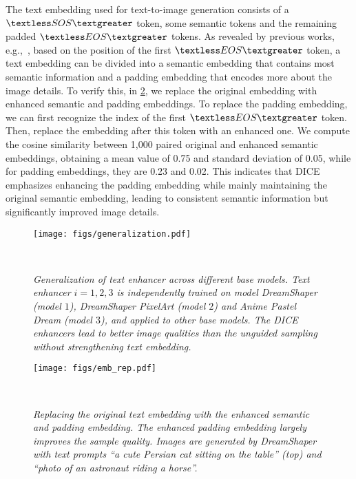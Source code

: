 The text embedding used for text-to-image generation consists of a $\textless SOS\textgreater$ token, some semantic tokens and the remaining padded $\textless EOS\textgreater$ tokens.
As revealed by previous works, e.g.,~\cite{yu2024uncovering}, based on the position of the first $\textless EOS\textgreater$ token, a text embedding can be divided into a semantic embedding that contains most semantic information and a padding embedding that encodes more about the image details. To verify this, in \cref{fig:emb_rep}, we replace the original embedding with enhanced semantic and padding embeddings. To replace the padding embedding, we can first recognize the index of the first $\textless EOS\textgreater$ token. Then, replace the embedding after this token with an enhanced one. We compute the cosine similarity between 1,000 paired original and enhanced semantic embeddings, obtaining a mean value of 0.75 and standard deviation of 0.05, while for padding embeddings, they are 0.23 and 0.02.
This indicates that DICE emphasizes enhancing the padding embedding while mainly maintaining the original semantic embedding, leading to consistent semantic information but significantly improved image details.



\begin{figure}[t]
\begin{center}
\texttt{[image: figs/generalization.pdf]}
    \captionsetup{skip=2pt}
    \caption{\small \it Generalization of \ourName text enhancer across different base models. Text enhancer $i = 1,2,3$ is independently trained on model DreamShaper (model $1$), DreamShaper PixelArt (model $2$) and Anime Pastel Dream (model $3$), and applied to other base models. The DICE enhancers lead to better image qualities than the unguided sampling without strengthening text embedding.
    }
    \label{fig:generalization}
\end{center}
~\vspace{-2em}
\end{figure}

\begin{figure}[H]
\begin{center}
    \texttt{[image: figs/emb\_rep.pdf]}
    \captionsetup{skip=2pt}
    \caption{\small \it Replacing the original text embedding with the enhanced semantic and padding embedding. The enhanced padding embedding largely improves the sample quality. Images are generated by DreamShaper with text prompts ``\textit{a cute Persian cat sitting on the table}'' (top) and ``\textit{photo of an astronaut riding a horse}''.}
    \label{fig:emb_rep}
\end{center}
~\vspace{-2em}
\end{figure}


